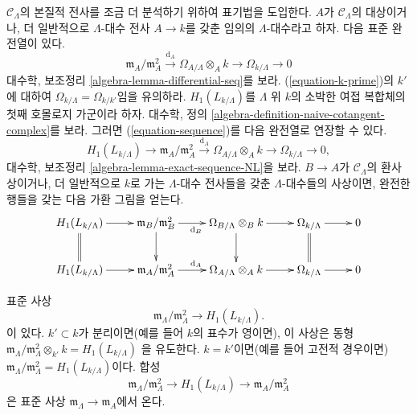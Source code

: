 \noindent
$\mathcal{C}_\Lambda$의 본질적 전사를 조금 더 분석하기 위하여 표기법을
도입한다. $A$가 $\mathcal{C}_\Lambda$의 대상이거나, 더 일반적으로
$\Lambda$-대수 전사 $A \to k$를 갖춘 임의의 $\Lambda$-대수라고 하자.
다음 표준 완전열이 있다.
\begin{equation}
\label{equation-sequence}
\mathfrak m_A/\mathfrak m_A^2 \xrightarrow{\text{d}_A}
\Omega_{A/\Lambda} \otimes_A k \to
\Omega_{k/\Lambda} \to 0
\end{equation}
대수학, 보조정리 \ref{algebra-lemma-differential-seq}를 보라.
(\ref{equation-k-prime})의 $k'$에 대하여
$\Omega_{k/\Lambda} = \Omega_{k/k'}$임을 유의하라.
$H_1(L_{k/\Lambda})$를 $\Lambda$ 위 $k$의 소박한 여접 복합체의 첫째
호몰로지 가군이라 하자. 대수학, 정의
\ref{algebra-definition-naive-cotangent-complex}를 보라.
그러면 (\ref{equation-sequence})를 다음 완전열로 연장할 수 있다.
\begin{equation}
\label{equation-sequence-extended}
H_1(L_{k/\Lambda}) \to
\mathfrak m_A/\mathfrak m_A^2 \xrightarrow{\text{d}_A}
\Omega_{A/\Lambda} \otimes_A k \to
\Omega_{k/\Lambda} \to 0,
\end{equation}
대수학, 보조정리 \ref{algebra-lemma-exact-sequence-NL}을 보라.
$B \to A$가 $\mathcal{C}_\Lambda$의 환사상이거나, 더 일반적으로
$k$로 가는 $\Lambda$-대수 전사들을 갖춘 $\Lambda$-대수들의 사상이면,
완전한 행들을 갖는 다음 가환 그림을 얻는다.
\begin{equation}
\label{equation-sequence-functorial}
\vcenter{
\xymatrix{
H_1(L_{k/\Lambda}) \ar[r] \ar@{=}[d] &
\mathfrak m_B/\mathfrak m_B^2 \ar[r]_{\text{d}_B} \ar[d] &
\Omega_{B/\Lambda} \otimes_B k \ar[r] \ar[d] &
\Omega_{k/\Lambda} \ar[r] \ar@{=}[d] & 0 \\
H_1(L_{k/\Lambda}) \ar[r] &
\mathfrak m_A/\mathfrak m_A^2 \ar[r]^{\text{d}_A} &
\Omega_{A/\Lambda} \otimes_A k \ar[r] &
\Omega_{k/\Lambda} \ar[r] & 0
}
}
\end{equation}

\begin{lemma}
\label{lemma-H1-separable-case}
표준 사상
$$
\mathfrak m_\Lambda/\mathfrak m_\Lambda^2 \longrightarrow H_1(L_{k/\Lambda}).
$$
이 있다. $k' \subset k$가 분리이면(예를 들어 $k$의 표수가 영이면), 이 사상은
동형
$\mathfrak m_\Lambda/\mathfrak m_\Lambda^2 \otimes_{k'} k = H_1(L_{k/\Lambda})$
을 유도한다. $k = k'$이면(예를 들어 고전적 경우이면)
$\mathfrak m_\Lambda/\mathfrak m_\Lambda^2 = H_1(L_{k/\Lambda})$이다.
합성
$$
\mathfrak m_\Lambda/\mathfrak m_\Lambda^2 \longrightarrow
H_1(L_{k/\Lambda}) \longrightarrow \mathfrak m_A/\mathfrak m_A^2
$$
은 표준 사상 $\mathfrak m_\Lambda \to \mathfrak m_A$에서 온다.
\end{lemma}

